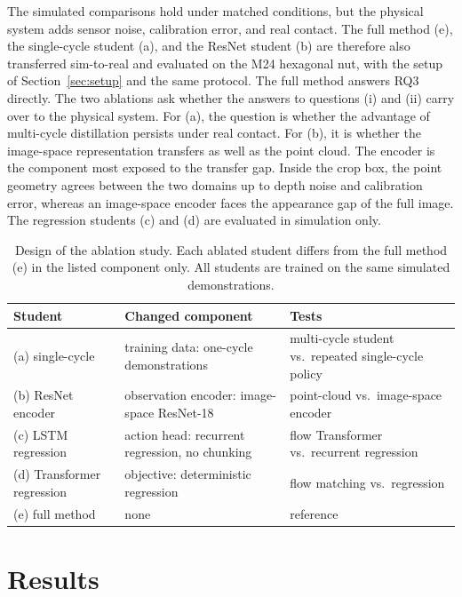 The simulated comparisons hold under matched conditions, but the physical system adds sensor noise, calibration error, and real contact. The full method (e), the single-cycle student (a), and the ResNet student (b) are therefore also transferred sim-to-real and evaluated on the M24 hexagonal nut, with the setup of Section~\ref{sec:setup} and the same protocol. The full method answers RQ3 directly. The two ablations ask whether the answers to questions (i) and (ii) carry over to the physical system. For (a), the question is whether the advantage of multi-cycle distillation persists under real contact. For (b), it is whether the image-space representation transfers as well as the point cloud. The encoder is the component most exposed to the transfer gap. Inside the crop box, the point geometry agrees between the two domains up to depth noise and calibration error, whereas an image-space encoder faces the appearance gap of the full image. The regression students (c) and (d) are evaluated in simulation only.

\begin{table}[htb]%
    \centering%
    \caption{Design of the ablation study. Each ablated student differs from the full method (e) in the listed component only. All students are trained on the same simulated demonstrations.}%
    \label{tab:ablation-design}%
    \small
    \begin{tabularx}{\textwidth}{l>{\raggedright\arraybackslash}X>{\raggedright\arraybackslash}X}
        \toprule
        Student & Changed component & Tests \\
        \midrule
        (a) single-cycle & training data: one-cycle demonstrations & multi-cycle student vs.\ repeated single-cycle policy \\
        (b) ResNet encoder & observation encoder: image-space ResNet-18 & point-cloud vs.\ image-space encoder \\
        (c) \acs{LSTM} regression & action head: recurrent regression, no chunking & flow Transformer vs.\ recurrent regression \\
        (d) Transformer regression & objective: deterministic regression & flow matching vs.\ regression \\
        (e) full method & none & reference \\
        \bottomrule
    \end{tabularx}
\end{table}%

\section{Results}\label{sec:results}

